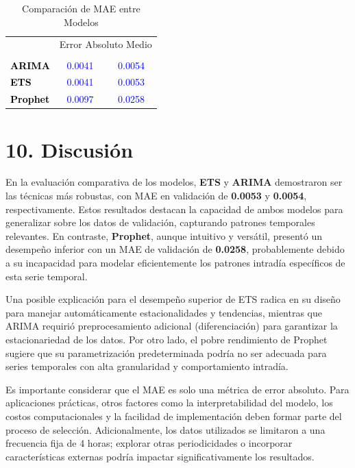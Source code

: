 \documentclass[
]{book}
\begin{document}
\begin{table}
\centering
\caption{\label{tab:unnamed-chunk-19}Comparación de MAE entre Modelos}
\centering
\fontsize{14}{16}\selectfont
\begin{tabular}[t]{>{}l|>{}c|>{}c}
\hline
\multicolumn{1}{c|}{ } & \multicolumn{2}{c}{Error Absoluto Medio} \\
\cline{2-3}
\cellcolor{black}{\textcolor{white}{\textbf{Modelo}}} & \cellcolor{black}{\textcolor{white}{\textbf{MAE Entrenamiento}}} & \cellcolor{black}{\textcolor{white}{\textbf{MAE Validación}}}\\
\hline
\textcolor{black}{\textbf{ARIMA}} & \textcolor{blue}{0.0041} & \textcolor{blue}{0.0054}\\
\hline
\textcolor{black}{\textbf{ETS}} & \textcolor{blue}{0.0041} & \textcolor{blue}{0.0053}\\
\hline
\textcolor{black}{\textbf{Prophet}} & \textcolor{blue}{0.0097} & \textcolor{blue}{0.0258}\\
\hline
\end{tabular}
\end{table}

\section{10. Discusión}\label{discusiuxf3n}

En la evaluación comparativa de los modelos, \textbf{ETS} y \textbf{ARIMA} demostraron ser las técnicas más robustas, con MAE en validación de \textbf{0.0053} y \textbf{0.0054}, respectivamente. Estos resultados destacan la capacidad de ambos modelos para generalizar sobre los datos de validación, capturando patrones temporales relevantes. En contraste, \textbf{Prophet}, aunque intuitivo y versátil, presentó un desempeño inferior con un MAE de validación de \textbf{0.0258}, probablemente debido a su incapacidad para modelar eficientemente los patrones intradía específicos de esta serie temporal.

Una posible explicación para el desempeño superior de ETS radica en su diseño para manejar automáticamente estacionalidades y tendencias, mientras que ARIMA requirió preprocesamiento adicional (diferenciación) para garantizar la estacionariedad de los datos. Por otro lado, el pobre rendimiento de Prophet sugiere que su parametrización predeterminada podría no ser adecuada para series temporales con alta granularidad y comportamiento intradía.

Es importante considerar que el MAE es solo una métrica de error absoluto. Para aplicaciones prácticas, otros factores como la interpretabilidad del modelo, los costos computacionales y la facilidad de implementación deben formar parte del proceso de selección. Adicionalmente, los datos utilizados se limitaron a una frecuencia fija de 4 horas; explorar otras periodicidades o incorporar características externas podría impactar significativamente los resultados.
\end{document}
